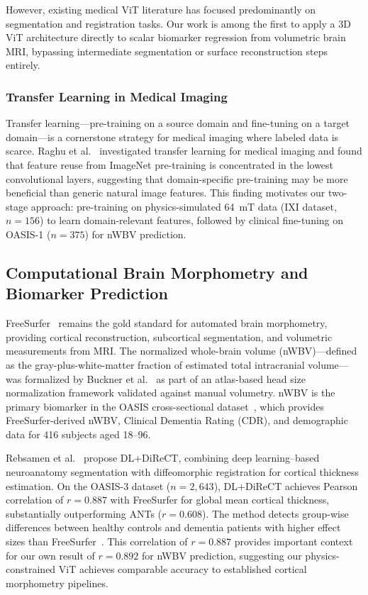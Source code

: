 However, existing medical ViT literature has focused predominantly on segmentation and registration tasks. Our work is among the first to apply a 3D ViT architecture directly to scalar biomarker regression from volumetric brain MRI, bypassing intermediate segmentation or surface reconstruction steps entirely.

\subsubsection{Transfer Learning in Medical Imaging}

Transfer learning---pre-training on a source domain and fine-tuning on a target domain---is a cornerstone strategy for medical imaging where labeled data is scarce. Raghu et al.~\cite{raghu2019transfusion} investigated transfer learning for medical imaging and found that feature reuse from ImageNet pre-training is concentrated in the lowest convolutional layers, suggesting that domain-specific pre-training may be more beneficial than generic natural image features. This finding motivates our two-stage approach: pre-training on physics-simulated 64~mT data (IXI dataset, $n = 156$) to learn domain-relevant features, followed by clinical fine-tuning on OASIS-1 ($n = 375$) for nWBV prediction.

\subsection{Computational Brain Morphometry and Biomarker Prediction}

FreeSurfer~\cite{fischl2012freesurfer} remains the gold standard for automated brain morphometry, providing cortical reconstruction, subcortical segmentation, and volumetric measurements from MRI. The normalized whole-brain volume (nWBV)---defined as the gray-plus-white-matter fraction of estimated total intracranial volume---was formalized by Buckner et al.~\cite{buckner2004nwbv} as part of an atlas-based head size normalization framework validated against manual volumetry. nWBV is the primary biomarker in the OASIS cross-sectional dataset~\cite{marcus2007oasis}, which provides FreeSurfer-derived nWBV, Clinical Dementia Rating (CDR), and demographic data for 416 subjects aged 18--96.

Rebsamen et al.~\cite{rebsamen2020corticalthickness} propose DL+DiReCT, combining deep learning--based neuroanatomy segmentation with diffeomorphic registration for cortical thickness estimation. On the OASIS-3 dataset ($n = 2{,}643$), DL+DiReCT achieves Pearson correlation of $r = 0.887$ with FreeSurfer for global mean cortical thickness, substantially outperforming ANTs ($r = 0.608$). The method detects group-wise differences between healthy controls and dementia patients with higher effect sizes than FreeSurfer~\cite{rebsamen2020corticalthickness}. This correlation of $r = 0.887$ provides important context for our own result of $r = 0.892$ for nWBV prediction, suggesting our physics-constrained ViT achieves comparable accuracy to established cortical morphometry pipelines.

